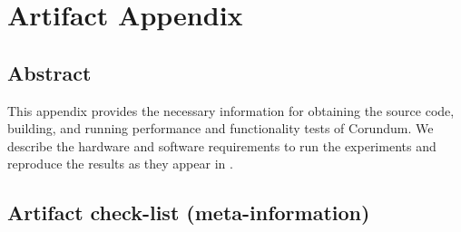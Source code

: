 

\clearpage 
\appendix
\section{Artifact Appendix}

\subsection{Abstract}

This appendix provides the necessary information for obtaining the source code,
building, and running performance and functionality tests of Corundum. 
We describe the hardware and software requirements to run the
experiments and reproduce the results as they appear in .

\subsection{Artifact check-list (meta-information)}

